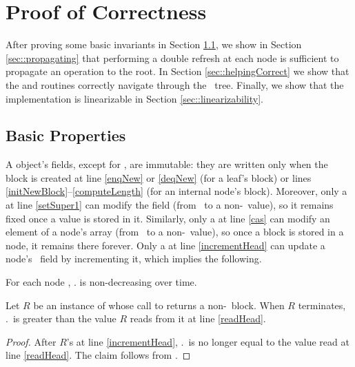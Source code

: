 
\section{Proof of Correctness}

After proving some basic invariants in Section \ref{sec::basicProperties},
we show in Section \ref{sec::propagating} that performing a double refresh at each node
is sufficient to propagate an operation to the root.
In Section \ref{sec::helpingCorrect} we show that the  and 
routines correctly navigate through the \ordering\ tree.
Finally, we show that the implementation is linearizable in Section \ref{sec::linearizability}.

\subsection{Basic Properties}
\label{sec::basicProperties}

A  object's fields, except for , are immutable:  they are written only 
when the block is created at line \ref{enqNew} or \ref{deqNew} (for a leaf's block) or lines \ref{initNewBlock}--\ref{computeLength} (for an internal node's block).  
Moreover, only a  at line \ref{setSuper1} can modify the  field 
(from \nl\ to a non-\nl\ value), so it remains fixed once a value is stored in it.
Similarly, only a  at line \ref{cas} can modify an element of a node's  array 
(from \nl\ to a non-\nl\ value), so once a block is stored in a node, it remains there forever.
Only a  at line \ref{incrementHead} can update a node's \head\ field by incrementing it,
which implies the following.

\begin{observation} \label{nonDecreasingHead}
For each node ,  . is non-decreasing over time.
\end{observation}

\begin{lemma} \label{lem::headInc}
Let $R$ be an instance of  whose call to  returns a non-\nl\ block.  When $R$ terminates, .\head\ is greater than the value $R$ reads from it at line \ref{readHead}.
\end{lemma}
\begin{proof}
After $R$'s  at line \ref{incrementHead}, .\head\ is no longer equal to the value 
read at line \ref{readHead}.  The claim follows from .
\end{proof}

